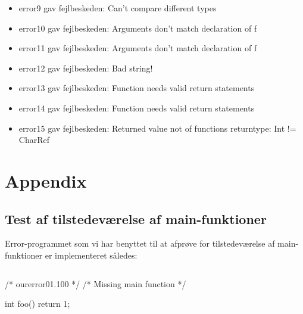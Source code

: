 \documentclass[10pt,a4paper,danish]{article}
\begin{document}
\begin{itemize}
\item error9 gav fejlbeskeden: Can't compare different types
\item error10 gav fejlbeskeden: Arguments don't match declaration of f
\item error11 gav fejlbeskeden: Arguments don't match declaration of f
\item error12 gav fejlbeskeden: Bad string!
\item error13 gav fejlbeskeden: Function needs valid return statements
\item error14 gav fejlbeskeden: Function needs valid return statements
\item error15 gav fejlbeskeden: Returned value not of functions returntype: Int != CharRef
\end{itemize}




\section{Appendix}
\subsection{Test af tilstedeværelse af main-funktioner}
Error-programmet som vi har benyttet til at afprøve for 
tilstedeværelse af main-funktioner er implementeret således: 

\begin{verbatim}
\end{verbatim}
/* ourerror01.100 */
/* Missing main function */

int foo()
{
        return 1;
}
\end{document}
